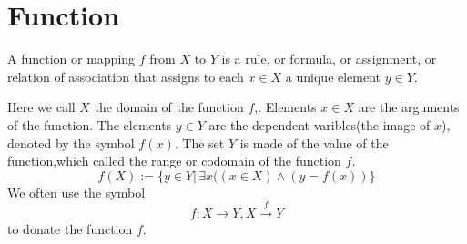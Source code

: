 \section{Function}

A function or mapping $f$ from $X$ to $Y$ is a rule, or formula, or assignment, or relation of association that assigns to each $x\in X$ a unique element $y\in Y$.

Here we call $X$ the domain of the function $f$,. Elements $x\in X$ are the arguments  of the function. The elements $y\in Y$ are the dependent varibles(the image of $x$), denoted by the symbol $f(x)$.
The set $Y$ is made of the value of the function,which called the range or codomain of the function $f$.
\[f(X):=\{y\in Y|\, \exists x((x\in X)\wedge(y=f(x))\}\]
We often use the symbol \[f:X\longrightarrow Y,X\stackrel{f}{\longrightarrow}Y\]to donate the function $f$.